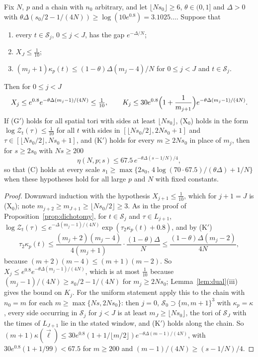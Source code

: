 \begin{theorem}\label{thm:Crate}
Fix $N$, $p$ and a chain with $n_0$ arbitrary, and let $\lfloor Ns_0\rfloor
\ge6$, $\theta\in(0,1]$ and $\Delta>0$ with $\theta\Delta(s_0/2-1/(4N))\ge
\log(10e^{0.8})=3.1025\ldots$. Suppose that
\begin{enumerate}[leftmargin=*]
\item[\textup{(G$'$)}] every $t\in\mathcal S_j$, $0\le j<J$, has the gap
$e^{-\Delta/N}$;
\item[\textup{(X$_0$)}] $X_J\le\frac1{10}$;
\item[\textup{(K$'$)}] $(m_j+1)\kappa_p(t)\le(1-\theta)\Delta(m_j-4)/N$ for
$0\le j<J$ and $t\in\mathcal S_j$.
\end{enumerate}
Then for $0\le j<J$
\[
X_j\le e^{0.8}e^{-\theta\Delta(m_j-1)/(4N)}\le\tfrac1{10},\qquad
K_j\le30e^{0.8}\Bigl(1+\frac1{m_{j+1}}\Bigr)e^{-\theta\Delta(m_j-1)/(4N)} .
\]
If \textup{(G$'$)} holds for all spatial tori with sides at least $\lfloor
Ns_0\rfloor$, \textup{(X$_0$)} holds in the form $\log\mathcal Z_t(\tau)\le
\frac1{10}$ for all $t$ with sides in $[\lfloor Ns_0/2\rfloor,2Ns_0+1]$ and
$\tau\in[\lfloor Ns_0/2\rfloor,Ns_0+1]$, and \textup{(K$'$)} holds for every
$m\ge2Ns_0$ in place of $m_j$, then for $s\ge2s_0$ with $Ns\ge200$
\[
\eta(N,p;s)\le67.5\,e^{-\theta\Delta(s-1/N)/4},
\]
so that \textup{(C)} holds at every scale $s_1\ge\max\{2s_0,\,4\log(70\cdot
67.5)/(\theta\Delta)+1/N\}$ when these hypotheses hold for all large $p$
and $N$ with fixed constants.
\end{theorem}

\begin{proof}
Downward induction with the hypothesis $X_{j+1}\le\frac1{10}$, which for
$j+1=J$ is (X$_0$); note $m_{j+2}\ge m_{J+1}\ge\lfloor Ns_0/2\rfloor\ge3$. As
in the proof of Proposition~\ref{prop:dichotomy}, for $t\in\mathcal S_j$ and
$\tau\in L_{j+1}$, $\log\mathcal Z_t(\tau)\le e^{-\Delta(m_j-1)/(4N)}\exp
(\tau_2\kappa_p(t)+0.8)$, and by (K$'$)
\[
\tau_2\kappa_p(t)\le\frac{(m_j+2)(m_j-4)}{4(m_j+1)}\cdot\frac{(1-\theta)
\Delta}N\le\frac{(1-\theta)\Delta(m_j-2)}{4N},
\]
because $(m+2)(m-4)\le(m+1)(m-2)$. So $X_j\le e^{0.8}e^{-\theta\Delta(m_j-1)
/(4N)}$, which is at most $\frac1{10}$ because $(m_j-1)/(4N)\ge s_0/2-1/
(4N)$ for $m_j\ge2Ns_0$; Lemma~\ref{lem:dual}(iii) gives the bound on $K_j$.
For the uniform statement apply this to the chain with $n_0=m$ for each
$m\ge\max\{Ns,2Ns_0\}$: then $j=0$, $\mathcal S_0\supset\{m,m+1\}^3$ with
$\kappa_p=\kappa$, every side occurring in $\mathcal S_j$ for $j<J$ is at
least $m_J\ge\lfloor Ns_0\rfloor$, the tori of $\mathcal S_J$ with the times
of $L_{J+1}$ lie in the stated window, and (K$'$) holds along the chain. So
$(m+1)\kappa(\vec\ell)\le30e^{0.8}(1+1/\lfloor m/2\rfloor)e^{-\theta\Delta
(m-1)/(4N)}$, with $30e^{0.8}(1+1/99)<67.5$ for $m\ge200$ and $(m-1)/(4N)
\ge(s-1/N)/4$.
\end{proof}

